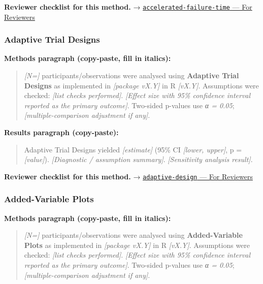 \documentclass[
]{article}
\begin{document}
\textbf{Reviewer checklist for this method.} →
\href{../chapters/11-survival/accelerated-failure-time.Rmd\#for-reviewers}{\texttt{accelerated-failure-time}
--- For Reviewers}

\subsubsection{Adaptive Trial Designs}\label{adaptive-trial-designs}

\textbf{Methods paragraph (copy-paste, fill in italics):}

\begin{quote}
\emph{{[}N={]}} participants/observations were analysed using
\textbf{Adaptive Trial Designs} as implemented in \emph{{[}package
vX.Y{]}} in R \emph{{[}vX.Y{]}}. Assumptions were checked: \emph{{[}list
checks performed{]}}. \emph{{[}Effect size with 95\% confidence interval
reported as the primary outcome{]}}. Two-sided p-values use \emph{α =
0.05}; \emph{{[}multiple-comparison adjustment if any{]}}.
\end{quote}

\textbf{Results paragraph (copy-paste):}

\begin{quote}
Adaptive Trial Designs yielded \emph{{[}estimate{]}} (95\% CI
\emph{{[}lower, upper{]}}, p = \emph{{[}value{]}}). \emph{{[}Diagnostic
/ assumption summary{]}}. \emph{{[}Sensitivity analysis result{]}}.
\end{quote}

\textbf{Reviewer checklist for this method.} →
\href{../chapters/14-clinical/adaptive-design.Rmd\#for-reviewers}{\texttt{adaptive-design}
--- For Reviewers}

\subsubsection{Added-Variable Plots}\label{added-variable-plots}

\textbf{Methods paragraph (copy-paste, fill in italics):}

\begin{quote}
\emph{{[}N={]}} participants/observations were analysed using
\textbf{Added-Variable Plots} as implemented in \emph{{[}package
vX.Y{]}} in R \emph{{[}vX.Y{]}}. Assumptions were checked: \emph{{[}list
checks performed{]}}. \emph{{[}Effect size with 95\% confidence interval
reported as the primary outcome{]}}. Two-sided p-values use \emph{α =
0.05}; \emph{{[}multiple-comparison adjustment if any{]}}.
\end{quote}
\end{document}
